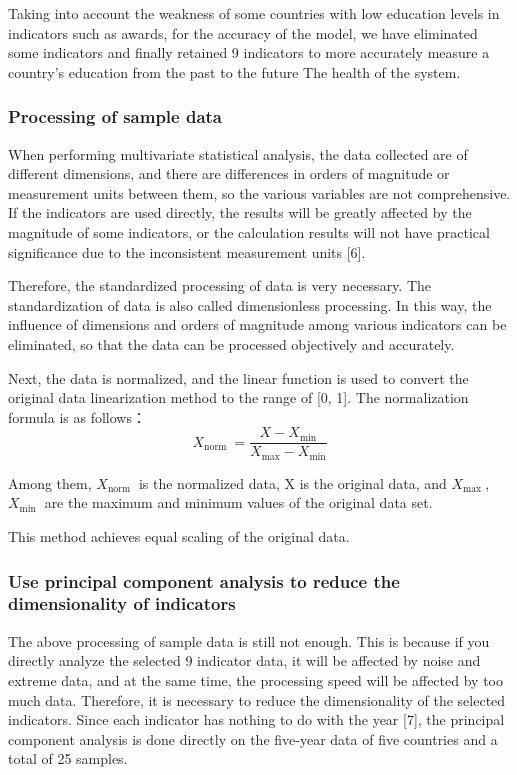 \documentclass[12pt]{article}  %
\begin{document}
Taking into account the weakness of some countries with low education levels in indicators such as awards, for the accuracy of the model, we have eliminated some indicators and finally retained 9 indicators to more accurately measure a country’s education from the past to the future The health of the system.


\subsubsection{Processing of sample data}

When performing multivariate statistical analysis, the data collected are of different dimensions, and there are differences in orders of magnitude or measurement units between them, so the various variables are not comprehensive. If the indicators are used directly, the results will be greatly affected by the magnitude of some indicators, or the calculation results will not have practical significance due to the inconsistent measurement units [6].

Therefore, the standardized processing of data is very necessary. The standardization of data is also called dimensionless processing. In this way, the influence of dimensions and orders of magnitude among various indicators can be eliminated, so that the data can be processed objectively and accurately.

Next, the data is normalized, and the linear function is used to convert the original data linearization method to the range of [0, 1]. The normalization formula is as follows：
\begin{equation}\label{eq:eq1}
X_{\text {norm }}=\frac{X-X_{\min }}{X_{\max }-X_{\min }}\end{equation}

Among them, $X_{\text {norm }}$ is the normalized data, X is the original data, and $X_{\text {max }}$, $X_{\text {min }}$ are the maximum and minimum values of the original data set.

This method achieves equal scaling of the original data.

\subsubsection{Use principal component analysis to reduce the dimensionality of indicators}

The above processing of sample data is still not enough. This is because if you directly analyze the selected 9 indicator data, it will be affected by noise and extreme data, and at the same time, the processing speed will be affected by too much data. Therefore, it is necessary to reduce the dimensionality of the selected indicators. Since each indicator has nothing to do with the year [7], the principal component analysis is done directly on the five-year data of five countries and a total of 25 samples.
\end{document}
